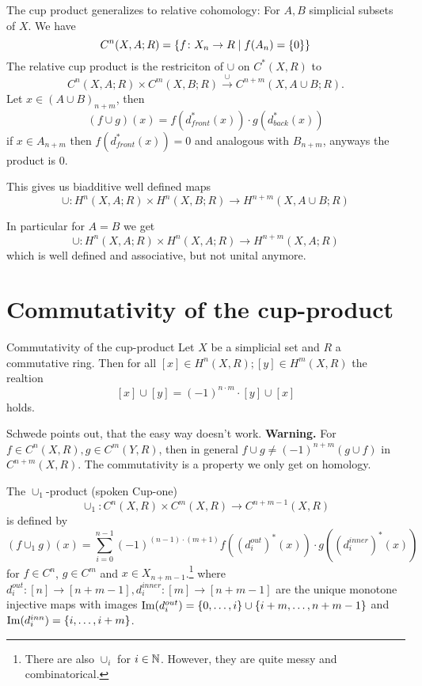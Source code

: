 \documentclass[language=english]{TemplateLecture}
\begin{document}
\begin{remark}
    The cup product generalizes to relative cohomology: For \(A, B\) simplicial subsets of \(X\). We have
    \[C^n(X,A;R) = \{f\colon X_n\to R \mid f(A_n) = \{0\}\}\]
    The relative cup product is the restriciton of \(\cup\) on \(C^*(X,R)\) to
    \[C^n(X,A;R) \times C^m(X,B;R) \xrightarrow{\cup} C^{n+m}(X,A\cup B;R).\]
    Let \(x \in (A \cup B)_{n+m}\), then
    \[(f\cup g)(x) = f(d_{front}^*(x)) \cdot g(d_{back}^*(x))\]
    if \(x \in A_{n+m}\) then \(f(d_{front}^*(x)) = 0\) and analogous with \(B_{n+m}\), anyways the product is 0.

    This gives us biadditive well defined maps
    \[\cup \colon H^n(X,A;R) \times H^n(X,B;R) \to H^{n+m}(X,A\cup B; R)\]

    In particular for \(A = B\) we get
    \[\cup\colon H^n(X,A;R) \times H^n(X,A;R) \to H^{n+m}(X,A;R)\]
    which is well defined and associative, but not unital anymore.
\end{remark}

\section{Commutativity of the cup-product}

\begin{thm}{Commutativity of the cup-product}{}
    Let \(X\) be a simplicial set and \(R\) a commutative ring. Then for all \([x] \in H^n(X,R); [y] \in H^m(X,R)\) the realtion
    \[[x] \cup [y] = (-1)^{n\cdot m} \cdot [y] \cup [x]\]
    holds.
\end{thm}

Schwede points out, that the easy way doesn't work.
\textbf{Warning.} For \(f \in C^n(X,R), g \in C^m(Y,R)\), then in general \(f\cup g \neq (-1)^{n+m} (g\cup f)\) in \(C^{n+m}(X,R)\). The commutativity is a property we only get on homology.


\begin{construction}
    The \(\cup_1\)-product (spoken Cup-one)
    \[\cup_1\colon C^n(X,R) \times C^m(X,R) \to C^{n+m-1}(X,R)\]
    is defined by
    \[(f\cup_1 g)(x) = \sum_{i =0}^{n-1} (-1)^{(n-1)\cdot (m+1)} f((d_i^{out})^*(x)) \cdot g((d_i^{inner})^*(x))\]
    for \(f\in C^n\), \(g \in C^m\) and \(x \in X_{n+m-1}\).\footnote{There are also \(\cup_i\) for \(i \in \mathbb{N}\). However, they are quite messy and combinatorical.}
    where \(d_i^{out}\colon [n] \to [n+m-1], d_i^{inner}\colon [m] \to [n+m-1]\) are the unique monotone injective maps with images \(\operatorname{Im}(d_i^{out}) = \{0, \dots, i\} \cup \{i+m, \dots, n+m-1\}\) and \(\operatorname{Im}(d_i^{inn}) = \{i, \dots, i+m\}\).
\end{construction}
\end{document}
